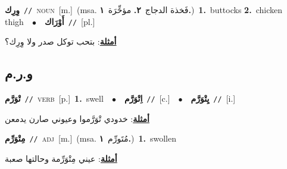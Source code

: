 \documentclass[10pt,a4paper,twoside]{article} %
\begin{document}
\begin{multicols}{2}
{\setlength\topsep{0pt}\textbf{\foreignlanguage{arabic}{وِرِك}}\ {\color{gray}\texttt{//}\color{black}}\ \textsc{noun}\ [m.]\ \color{gray}(msa. \foreignlanguage{arabic}{فَخذة الدجاج}~\foreignlanguage{arabic}{\textbf{٢.}}  \foreignlanguage{arabic}{مؤخِّرَة}~\foreignlanguage{arabic}{\textbf{١.}})\color{black}\ \textbf{1.}~buttocks  \textbf{2.}~chicken thigh\ \ $\bullet$\ \ \setlength\topsep{0pt}\textbf{\foreignlanguage{arabic}{أَوْرَاك}}\ {\color{gray}\texttt{//}\color{black}}\ [pl.]\  \begin{flushright}\color{gray}\foreignlanguage{arabic}{\textbf{\underline{\foreignlanguage{arabic}{أمثلة}}}: بتحب توكل صدر ولا وِرِك؟}\end{flushright}\color{black}} \vspace{2mm}

\vspace{-3mm}
\subsection*{\color{blue}\foreignlanguage{arabic}{و.ر.م}\color{blue}{}} 

{\setlength\topsep{0pt}\textbf{\foreignlanguage{arabic}{تْوَرَّم}}\ {\color{gray}\texttt{//}\color{black}}\ \textsc{verb}\ [p.]\ \textbf{1.}~swell\ \ $\bullet$\ \ \setlength\topsep{0pt}\textbf{\foreignlanguage{arabic}{اِتْوَرَّم}}\ {\color{gray}\texttt{//}\color{black}}\ [c.]\ \ $\bullet$\ \ \setlength\topsep{0pt}\textbf{\foreignlanguage{arabic}{يِتْوَرَّم}}\ {\color{gray}\texttt{//}\color{black}}\ [i.]\  \begin{flushright}\color{gray}\foreignlanguage{arabic}{\textbf{\underline{\foreignlanguage{arabic}{أمثلة}}}: خدودي تْوَرَّموا وعيوني صارن يدمعن}\end{flushright}\color{black}} \vspace{2mm}

{\setlength\topsep{0pt}\textbf{\foreignlanguage{arabic}{مِتْوَرِّم}}\ {\color{gray}\texttt{//}\color{black}}\ \textsc{adj}\ [m.]\ \color{gray}(msa. \foreignlanguage{arabic}{مُتَورِّم}~\foreignlanguage{arabic}{\textbf{١.}})\color{black}\ \textbf{1.}~swollen\  \begin{flushright}\color{gray}\foreignlanguage{arabic}{\textbf{\underline{\foreignlanguage{arabic}{أمثلة}}}: عيني مِتْوَرِّمة وحالتها صعبة}\end{flushright}\color{black}} \vspace{2mm}


\end{multicols}
\end{document}
